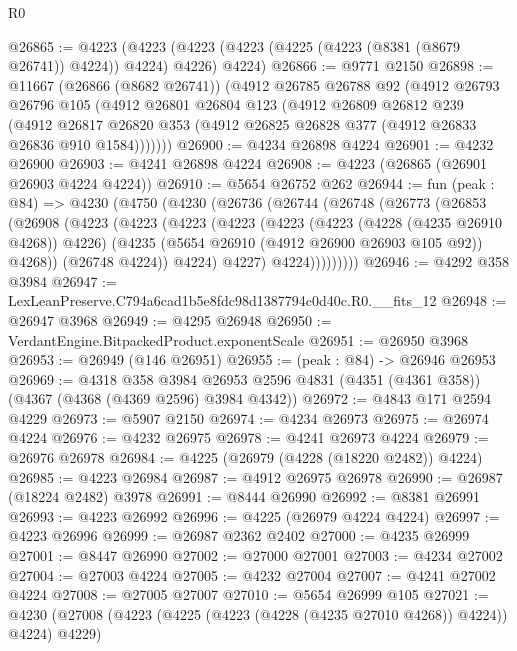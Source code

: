 \begin{lexlean}{R0}
\begin{coremodule}
@26865 := @4223
    (@4223 (@4223 (@4223 (@4225 (@4223 (@8381 (@8679 @26741)) @4224)) @4224) @4226) @4224)
@26866 := @9771 @2150
@26898 := @11667
    (@26866 (@8682 @26741))
    (@4912
      @26785
      @26788
      @92
      (@4912
        @26793
        @26796
        @105
        (@4912
          @26801
          @26804
          @123
          (@4912
            @26809
            @26812
            @239
            (@4912
              @26817
              @26820
              @353
              (@4912 @26825 @26828 @377 (@4912 @26833 @26836 @910 @1584)))))))
@26900 := @4234 @26898 @4224
@26901 := @4232 @26900
@26903 := @4241 @26898 @4224
@26908 := @4223 (@26865 (@26901 @26903 @4224 @4224))
@26910 := @5654 @26752 @262
@26944 := fun (peak : @84) =>
  @4230
    (@4750
      (@4230
        (@26736
          (@26744
            (@26748
              (@26773
                (@26853
                  (@26908
                    (@4223
                      (@4223
                        (@4223
                          (@4223
                            (@4223
                              (@4223 (@4228 (@4235 @26910 @4268)) @4226)
                              (@4235 (@5654 @26910 (@4912 @26900 @26903 @105 @92)) @4268))
                            (@26748 @4224))
                          @4224)
                        @4227)
                      @4224)))))))))
@26946 := @4292 @358 @3984
@26947 := LexLeanPreserve.C794a6cad1b5e8fdc98d1387794c0d40c.R0.__fits_12
@26948 := @26947 @3968
@26949 := @4295 @26948
@26950 := VerdantEngine.BitpackedProduct.exponentScale
@26951 := @26950 @3968
@26953 := @26949 (@146 @26951)
@26955 := (peak : @84) -> @26946 @26953
@26969 := @4318
    @358
    @3984
    @26953
    @2596
    @4831
    (@4351 (@4361 @358))
    (@4367 (@4368 (@4369 @2596) @3984 @4342))
@26972 := @4843 @171 @2594 @4229
@26973 := @5907 @2150
@26974 := @4234 @26973
@26975 := @26974 @4224
@26976 := @4232 @26975
@26978 := @4241 @26973 @4224
@26979 := @26976 @26978
@26984 := @4225 (@26979 (@4228 (@18220 @2482)) @4224)
@26985 := @4223 @26984
@26987 := @4912 @26975 @26978
@26990 := @26987 (@18224 @2482) @3978
@26991 := @8444 @26990
@26992 := @8381 @26991
@26993 := @4223 @26992
@26996 := @4225 (@26979 @4224 @4224)
@26997 := @4223 @26996
@26999 := @26987 @2362 @2402
@27000 := @4235 @26999
@27001 := @8447 @26990
@27002 := @27000 @27001
@27003 := @4234 @27002
@27004 := @27003 @4224
@27005 := @4232 @27004
@27007 := @4241 @27002 @4224
@27008 := @27005 @27007
@27010 := @5654 @26999 @105
@27021 := @4230 (@27008 (@4223 (@4225 (@4223 (@4228 (@4235 @27010 @4268)) @4224)) @4224) @4229)

\end{coremodule}
\end{lexlean}
